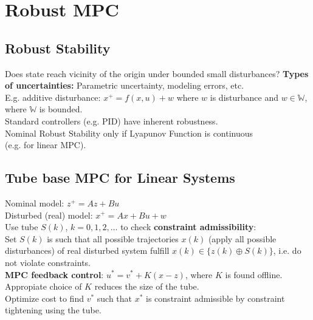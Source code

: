 \documentclass[english]{latex4ei/latex4ei_sheet}
\begin{document}
\section{Robust MPC}
\begin{sectionbox}

\subsection{Robust Stability}
Does state reach vicinity of the origin under bounded small disturbances?
\vspace{0.1cm}
\textbf{Types of uncertainties:} Parametric uncertainty, modeling errors, etc.\\
E.g. additive disturbance: $x^{+}=f(x,u)+w$ where $w$ is disturbance and $w\in\mathbb{W}$, where $\mathbb{W}$ is bounded.
\vspace{0.1cm}\\
Standard controllers (e.g. PID) have inherent robustness.\\ Nominal Robust Stability only if Lyapunov Function is continuous \\(e.g. for linear MPC).\\

\subsection{Tube base MPC for Linear Systems}
Nominal model: $z^{+}=Az+Bu$\\
Disturbed (real) model: $x^{+}=Ax+Bu+w$
\vspace{0.1cm}\\
Use tube $S(k)$, $k=0,1,2,\ldots$ to check \textbf{constraint admissibility}:\\
Set $S(k)$ is such that all possible trajectories $x(k)$  (apply all possible disturbances) of real disturbed system fulfill $x(k)\in\{z(k) \oplus S(k)\}$, i.e. do not violate constraints.\\
\textbf{MPC feedback control}: $u^{*}=v^{*}+K(x-z)$, where $K$ is found offline. Appropiate choice of $K$ reduces the size of the tube.\\
Optimize cost to find $v^{*}$ such that $x^{*}$ is constraint admissible by constraint tightening using the tube.

\end{sectionbox}


\end{document}
